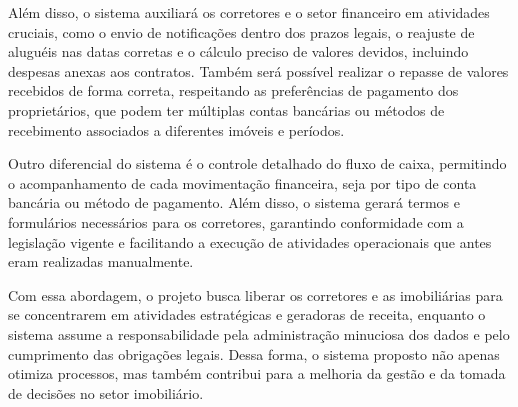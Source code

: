 \documentclass[a4paper,12pt]{article}
\begin{document}
    Além disso, o sistema auxiliará os corretores e o setor financeiro em atividades cruciais, como o envio de notificações dentro dos prazos legais, o reajuste de aluguéis nas datas corretas e o cálculo preciso de valores devidos, incluindo despesas anexas aos contratos. Também será possível realizar o repasse de valores recebidos de forma correta, respeitando as preferências de pagamento dos proprietários, que podem ter múltiplas contas bancárias ou métodos de recebimento associados a diferentes imóveis e períodos.

    Outro diferencial do sistema é o controle detalhado do fluxo de caixa, permitindo o acompanhamento de cada movimentação financeira, seja por tipo de conta bancária ou método de pagamento. Além disso, o sistema gerará termos e formulários necessários para os corretores, garantindo conformidade com a legislação vigente e facilitando a execução de atividades operacionais que antes eram realizadas manualmente.

    Com essa abordagem, o projeto busca liberar os corretores e as imobiliárias para se concentrarem em atividades estratégicas e geradoras de receita, enquanto o sistema assume a responsabilidade pela administração minuciosa dos dados e pelo cumprimento das obrigações legais. Dessa forma, o sistema proposto não apenas otimiza processos, mas também contribui para a melhoria da gestão e da tomada de decisões no setor imobiliário.

    
   
    
    
    
    
    

     

    
\end{document}
